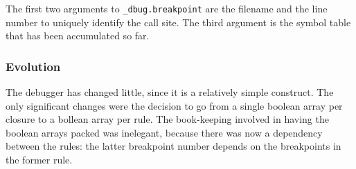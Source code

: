 The first two arguments to \verb|_dbug.breakpoint| are the filename and the line number to uniquely identify the call site.
The third argument is the symbol table that has been accumulated so far.

\subsubsection{Evolution}
The debugger has changed little, since it is a relatively simple construct.
The only significant changes were the decision to go from a single boolean array per closure to a bollean array per rule.
The book-keeping involved in having the boolean arrays packed was inelegant, because there was now a dependency between the rules: the latter breakpoint number depends on the breakpoints in the former rule.

